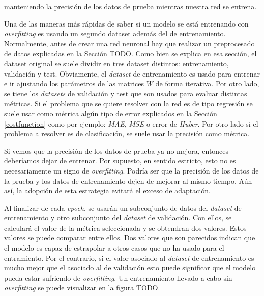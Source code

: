 manteniendo la precisión de los datos de prueba mientras nuestra red se entrena. 

Una de las maneras más rápidas de saber si un modelo se está entrenando con \textit{overfitting} es usando un segundo dataset además del de entrenamiento. Normalmente, antes de crear una red neuronal hay que realizar un preprocesado de datos explicadas en la Sección TODO. Como bien se explica en esa sección, el dataset original se suele dividir en tres dataset distintos: entrenamiento, validación y test. Obviamente, el \textit{dataset} de entrenamiento es usado para entrenar e ir ajustando los parámetros de las matrices $W$ de forma iterativa. Por otro lado, se tiene los \textit{datasets} de validación y test que son usados para evaluar distintas métricas. Si el problema que se quiere resolver con la red es de tipo regresión se suele usar como métrica algún tipo de error explicados en la Sección \ref{costfunction} como por ejemplo: \textit{MAE}, \textit{MSE} o error de \textit{Huber}. Por otro lado si el problema a resolver es de clasificación, se suele usar la precisión como métrica.
\newline

Si vemos que la precisión de los datos de prueba ya no mejora, entonces deberíamos dejar de entrenar. Por supuesto, en sentido estricto, esto no es necesariamente un signo de \textit{overfitting}. Podría ser que la precisión de los datos de la prueba y los datos de entrenamiento dejen de mejorar al mismo tiempo. Aún así, la adopción de esta estrategia evitará el exceso de adaptación.
\newline

Al finalizar de cada \textit{epoch}, se usarán un subconjunto de datos del \textit{dataset} de entrenamiento y otro subconjunto del \textit{dataset} de validación. Con ellos, se calculará el valor de la métrica seleccionada y se obtendran dos valores. Estos valores se puede comparar entre ellos. Dos valores que son parecidos indican que el modelo es capaz de estrapolar a otros casos que no ha usado para el entramiento. Por el contrario, si el valor asociado al \textit{dataset} de entrenamiento es mucho mejor que el asociado al de validación esto puede significar que el modelo pueda estar sufriendo de \textit{overfitting}. Un entrenamiento llevado a cabo sin \textit{overfitting} se puede visualizar en la figura TODO.
\newline

